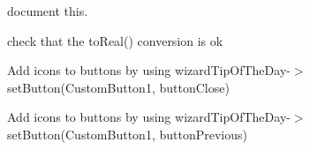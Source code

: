 \begin{DoxyRefList}
%
document this.  
\item[Member \mbox{\hyperlink{imgui__main_8c_a9c46d1b36fc04b5e871fb69cbeef6738}{text\+Size\+Selector\+Index\+Changed}} (int index)]\label{todo__todo000175}%
%
check that the to\+Real() conversion is ok  
\item[Member \mbox{\hyperlink{imgui__main_8c_ac1272afea42e08c828e1cb040ba5c903}{tip\+\_\+of\+\_\+the\+\_\+day\+\_\+dialog}} (void)]\label{todo__todo000032}%
%
Add icons to buttons by using wizard\+Tip\+Of\+The\+Day-\/\texorpdfstring{$>$}{>}set\+Button(\+Custom\+Button1, button\+Close) 

\label{todo__todo000030}%
%
Add icons to buttons by using wizard\+Tip\+Of\+The\+Day-\/\texorpdfstring{$>$}{>}set\+Button(\+Custom\+Button1, button\+Previous)


\end{DoxyRefList}
